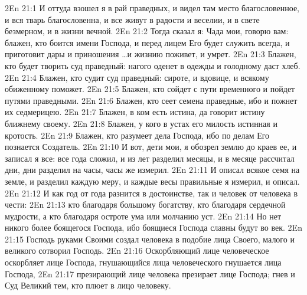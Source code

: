 \vs 2En 21:1
И оттуда взошел я в рай праведных, и видел там место благословенное, и вся тварь благословенна, и все живут в радости и веселии, и в свете безмерном, и в жизни вечной.
\vs 2En 21:2
Тогда сказал я: Чада мои, говорю вам: блажен, кто боится имени Господа, и перед лицем Его будет служить всегда, и приготовит дары и приношения \ldots и жизнию поживет, и умрет.
\vs 2En 21:3
Блажен, кто будет творить суд праведный: нагого оденет в одежды и голодному даст хлеб.
\vs 2En 21:4
Блажен, кто судит суд праведный: сироте, и вдовице, и всякому обиженному поможет.
\vs 2En 21:5
Блажен, кто сойдет с пути временного и пойдет путями праведными.
\vs 2En 21:6
Блажен, кто сеет семена праведные, ибо и пожнет их седмерицею.
\vs 2En 21:7
Блажен, в ком есть истина, да говорит истину ближнему своему.
\vs 2En 21:8
Блажен, у кого в устах его милость истинная и кротость.
\vs 2En 21:9
Блажен, кто разумеет дела Господа, ибо по делам Его познается Создатель.
\vs 2En 21:10
И вот, дети мои, я обозрел землю до краев ее, и записал я все: все года сложил, и из лет разделил месяцы, и в месяце рассчитал дни, дни разделил на часы, часы же измерил.
\vs 2En 21:11
И описал всякое семя на земле, и разделил каждую меру, и каждые весы правильные я измерил, и описал.
\vs 2En 21:12
И как год от года разнится в достоинстве, так и человек от человека в чести:
\vs 2En 21:13
кто благодаря большому богатству, кто благодаря сердечной мудрости, а кто благодаря остроте ума или молчанию уст.
\vs 2En 21:14
Но нет никого более боящегося Господа, ибо боящиеся Господа славны будут во век.
\vs 2En 21:15
Господь руками Своими создал человека в подобие лица Своего, малого и великого сотворил Господь.
\vs 2En 21:16
Оскорбляющий лице человеческое оскорбляет лице Господа, гнушающийся лица человеческого гнушается лица Господа,
\vs 2En 21:17
презирающий лице человека презирает лице Господа; гнев и Суд Великий тем, кто плюет в лицо человеку.

